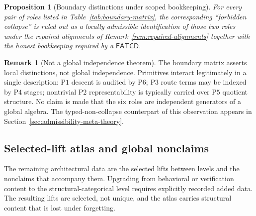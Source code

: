 \documentclass[11pt]{article}
\newtheorem{proposition}[theorem]{Proposition}
\theoremstyle{definition}
\newtheorem{remark}[theorem]{Remark}
\newcommand{\FATCD}{\ensuremath{\mathsf{FATCD}}}
\newcommand{\Pone}{\ensuremath{\mathrm{P1}}}
\newcommand{\Ptwo}{\ensuremath{\mathrm{P2}}}
\newcommand{\Pthree}{\ensuremath{\mathrm{P3}}}
\newcommand{\Pfour}{\ensuremath{\mathrm{P4}}}
\newcommand{\Pfive}{\ensuremath{\mathrm{P5}}}
\newcommand{\Psix}{\ensuremath{\mathrm{P6}}}
\begin{document}
\begin{proposition}[Boundary distinctions under scoped bookkeeping]\label{prop:boundary-distinctions}
For every pair of roles listed in Table~\ref{tab:boundary-matrix}, the
corresponding ``forbidden collapse'' is ruled out as a locally admissible
identification of those two roles under the repaired alignments of
Remark~\ref{rem:repaired-alignments} together with the honest bookkeeping
required by a \FATCD{}.
\end{proposition}

\begin{remark}[Not a global independence theorem]\label{rem:not-global-independence}
The boundary matrix asserts local distinctions, not global
independence. Primitives interact legitimately in a single
description: \Pone{} descent is audited by \Psix{}; \Pthree{} route
terms may be indexed by \Pfour{} stages; nontrivial \Ptwo{}
representability is typically carried over \Pfive{} quotient structure.
No claim is made that the six roles are independent generators of a
global algebra. The typed-non-collapse counterpart of this observation
appears in Section~\ref{sec:admissibility-meta-theory}.
\end{remark}

\subsection{Selected-lift atlas and global nonclaims}\label{subsec:lift-atlas}

The remaining architectural data are the selected lifts between levels
and the nonclaims that accompany them. Upgrading from behavioral or
verification content to the structural-categorical level requires
explicitly recorded added data. The resulting lifts are selected, not
unique, and the atlas carries structural content that is lost under
forgetting.
\end{document}
